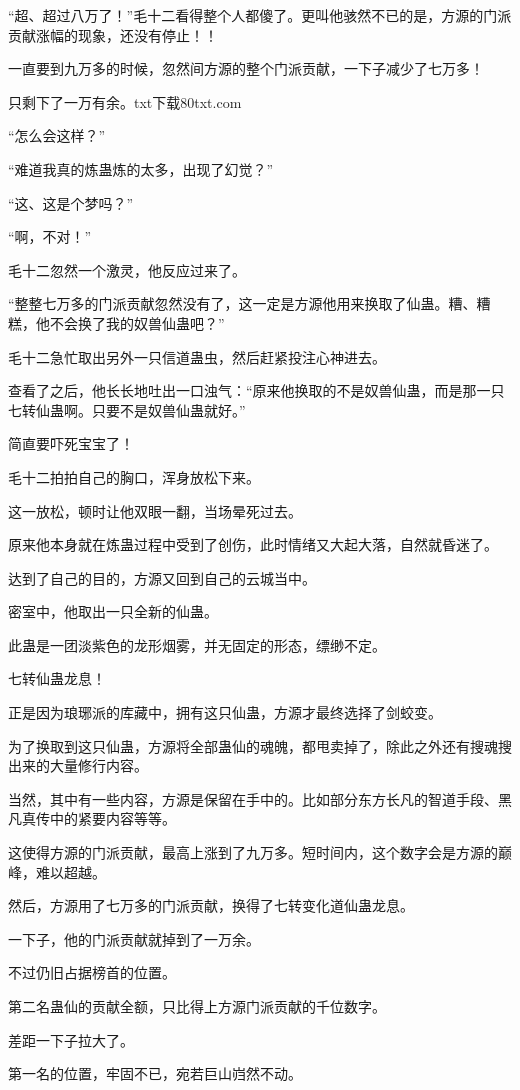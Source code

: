 \begin{this_body}
“超、超过八万了！”毛十二看得整个人都傻了。更叫他骇然不已的是，方源的门派贡献涨幅的现象，还没有停止！！

一直要到九万多的时候，忽然间方源的整个门派贡献，一下子减少了七万多！

只剩下了一万有余。txt下载80txt.com

“怎么会这样？”

“难道我真的炼蛊炼的太多，出现了幻觉？”

“这、这是个梦吗？”

“啊，不对！”

毛十二忽然一个激灵，他反应过来了。

“整整七万多的门派贡献忽然没有了，这一定是方源他用来换取了仙蛊。糟、糟糕，他不会换了我的奴兽仙蛊吧？”

毛十二急忙取出另外一只信道蛊虫，然后赶紧投注心神进去。

查看了之后，他长长地吐出一口浊气：“原来他换取的不是奴兽仙蛊，而是那一只七转仙蛊啊。只要不是奴兽仙蛊就好。”

简直要吓死宝宝了！

毛十二拍拍自己的胸口，浑身放松下来。

这一放松，顿时让他双眼一翻，当场晕死过去。

原来他本身就在炼蛊过程中受到了创伤，此时情绪又大起大落，自然就昏迷了。

达到了自己的目的，方源又回到自己的云城当中。

密室中，他取出一只全新的仙蛊。

此蛊是一团淡紫色的龙形烟雾，并无固定的形态，缥缈不定。

七转仙蛊龙息！

正是因为琅琊派的库藏中，拥有这只仙蛊，方源才最终选择了剑蛟变。

为了换取到这只仙蛊，方源将全部蛊仙的魂魄，都甩卖掉了，除此之外还有搜魂搜出来的大量修行内容。

当然，其中有一些内容，方源是保留在手中的。比如部分东方长凡的智道手段、黑凡真传中的紧要内容等等。

这使得方源的门派贡献，最高上涨到了九万多。短时间内，这个数字会是方源的巅峰，难以超越。

然后，方源用了七万多的门派贡献，换得了七转变化道仙蛊龙息。

一下子，他的门派贡献就掉到了一万余。

不过仍旧占据榜首的位置。

第二名蛊仙的贡献全额，只比得上方源门派贡献的千位数字。

差距一下子拉大了。

第一名的位置，牢固不已，宛若巨山岿然不动。


\end{this_body}
